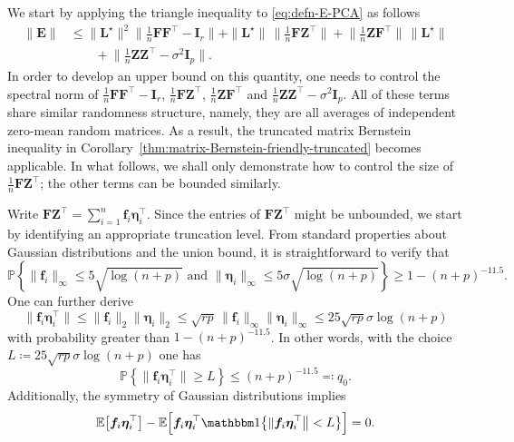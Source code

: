 We start by applying the triangle inequality to \eqref{eq:defn-E-PCA} as follows
%
\begin{align}
\|\bm{E}\| & \leq \big\|\bm{L}^{\star}\big\|^{2}\Big\|\frac{1}{n}\bm{F}\bm{F}^{\top}-\bm{I}_{r}\Big\|+\|\bm{L}^{\star} \|\,\Big\|\frac{1}{n}\bm{F}\bm{Z}^{\top}\Big\|+\Big\|\frac{1}{n}\bm{Z}\bm{F}^{\top}\Big\|\,\big\|\bm{L}^{\star} \big\|\nonumber \\
 & \qquad+\Big\|\frac{1}{n}\bm{Z}\bm{Z}^{\top}-\sigma^{2}\bm{I}_{p}\Big\|.
\label{eq:defn-E-decompose-PCA-triangle}
\end{align}
%
In order to develop an upper bound on this quantity, one needs to control the spectral
norm of $\frac{1}{n}\bm{F}\bm{F}^{\top}-\bm{I}_{r}$, $\frac{1}{n}\bm{F}\bm{Z}^{\top}$,
$\frac{1}{n}\bm{Z}\bm{F}^{\top}$ and $\frac{1}{n}\bm{Z}\bm{Z}^{\top}-\sigma^{2}\bm{I}_{p}$.
All of these terms share similar randomness structure, namely, they are all averages of independent zero-mean random matrices.
As a result, the truncated matrix Bernstein inequality in Corollary~\ref{thm:matrix-Bernstein-friendly-truncated} becomes applicable.
In what follows, we shall only demonstrate how to control the size
of $\frac{1}{n}\bm{F}\bm{Z}^{\top}$; the other terms can be bounded similarly.



Write
$
\bm{F}\bm{Z}^{\top}=\sum_{i=1}^{n}\bm{f}_{i}\bm{\eta}_{i}^{\top}
$.
Since the entries of $\bm{F}\bm{Z}^{\top}$ might be unbounded, we
start by identifying an appropriate truncation level. From standard
properties about Gaussian distributions and the union bound, it is
straightforward to verify that
\[
\mathbb{P}\left\{  \|\bm{f}_{i}\big\|_{\infty}\leq5\sqrt{\log(n+p)}\text{ and }\|\bm{\eta}_{i}\big\|_{\infty}\leq5\sigma\sqrt{\log(n+p)}\right\} \geq1-(n+p)^{-11.5}.
\]
One can further derive
%
\[
	\|\bm{f}_{i}\bm{\eta}_{i}^{\top}\big\|
	\leq\|\bm{f}_{i}\big\|_{2}\|\bm{\eta}_{i}\big\|_{2} \leq\sqrt{rp}\,\|\bm{f}_{i}\big\|_{\infty}\|\bm{\eta}_{i}\big\|_{\infty}\leq25\sqrt{rp}\sigma\log(n+p)
\]
%
with probability greater than $1-(n+p)^{-11.5}$. In other words,
with the choice $L\coloneqq 25\sqrt{rp}\sigma\log(n+p)$ one has
\[
\mathbb{P}\left\{ \|\bm{f}_{i}\bm{\eta}_{i}^{\top}\big\|\geq L\right\} \leq(n+p)^{-11.5}\eqqcolon q_{0}.
\]
Additionally, the symmetry of Gaussian distributions implies
%
\[
	\mathbb{E}\big[\bm{f}_{i}\bm{\eta}_{i}^{\top}\big]
	- \mathbb{E}\Big[\bm{f}_{i}\bm{\eta}_{i}^{\top}\mathbbm1\big\{\|\bm{f}_{i}\bm{\eta}_{i}^{\top}\big\| < L\big\}\Big]
	=0.
\]

